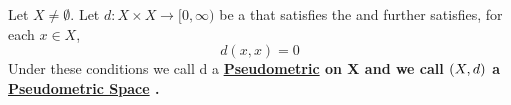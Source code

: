 \label{def:pseudometric}
\newcommand{\Pseudometric}[0]{
    \bf \hyperref[def:pseudometric]{Pseudometric} \rm
}
\newcommand{\PseudometricSpace}[0]{
    \bf \hyperref[def:pseudometric]{Pseudometric Space} \rm
}

\begin{df}[Pseudometric]
    Let $X \neq \emptyset$. 
    Let $d:X \times X \to [0,\infty)$ be a \SymmetricMap that satisfies the \TriangleInequality and further satisfies, for each $x \in X$, 
    \begin{equation}
        d(x,x) = 0
    \end{equation}
    Under these conditions we call d a \Pseudometric on X and we call $\left( X,d\right)$ a \PseudometricSpace.
    \end{df} 
